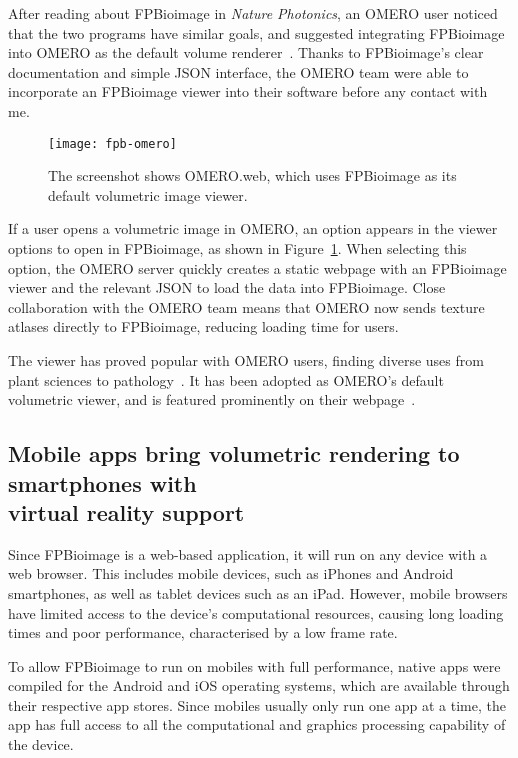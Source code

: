 After reading about FPBioimage in \textit{Nature Photonics}, an OMERO user noticed that the two programs have similar goals, and suggested integrating FPBioimage into OMERO as the default volume renderer~\cite{ehrenfeuchter2017comment}.
Thanks to FPBioimage's clear documentation and simple JSON interface, the OMERO team were able to incorporate an FPBioimage viewer into their software before any contact with me.

\begin{figure}[htbp!]
\centering
\texttt{[image: fpb-omero]}
\caption[FPBioimage: OMERO.web uses FPBioimage as its default renderer for 3D data]{The screenshot shows OMERO.web, which uses FPBioimage as its default volumetric image viewer. } %
\label{fig:fpbOMERO}
\end{figure}

If a user opens a volumetric image in OMERO, an option appears in the viewer options to open in FPBioimage, as shown in Figure~\ref{fig:fpbOMERO}.
When selecting this option, the OMERO server quickly creates a static webpage with an FPBioimage viewer and the relevant JSON to load the data into FPBioimage.
Close collaboration with the OMERO team means that OMERO now sends texture atlases directly to FPBioimage, reducing loading time for users.

The viewer has proved popular with OMERO users, finding diverse uses from plant sciences to pathology~\cite{fleur2018fpbioimage}.
It has been adopted as OMERO's default volumetric viewer, and is featured prominently on their webpage~\cite{omero2018website}.

\subsection[Mobile apps bring volumetric rendering to smartphones with virtual reality support]{Mobile apps bring volumetric rendering to smartphones with\\ virtual reality support}
Since FPBioimage is a web-based application, it will run on any device with a web browser.
This includes mobile devices, such as iPhones and Android smartphones, as well as tablet devices such as an iPad.
However, mobile browsers have limited access to the device's computational resources, causing long loading times and poor performance, characterised by a low frame rate.

To allow FPBioimage to run on mobiles with full performance, native apps were compiled for the Android and iOS operating systems, which are available through their respective app stores.
Since mobiles usually only run one app at a time, the app has full access to all the computational and graphics processing capability of the device.

